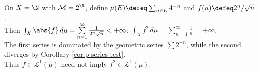 \begin{example} \label{ex:l1-not-closed-under-squaring} \\
On $X=\N$ with $\mathcal{M}=2^\N$, define $\mu(E)\defeq\sum_{n\in E}4^{-n}$ and $f(n)\defeq 2^n/\sqrt{n}$.\\
Then $\int_X\abs{f}\,d\mu=\sum\limits_{n=1}^{\infty}\frac{1}{2^n\sqrt{n}}<+\infty$; $\int_X f^2\,d\mu=\sum\limits_{n=1}^{\infty}\frac1n=+\infty$.\\
The first series is dominated by the geometric series $\sum2^{-n}$, while the second diverges by Corollary \ref{cor:p-series-test}.\\
Thus $f\in\mathscr{L}^1(\mu)$ need not imply $f^2\in\mathscr{L}^1(\mu)$.
\end{example}

